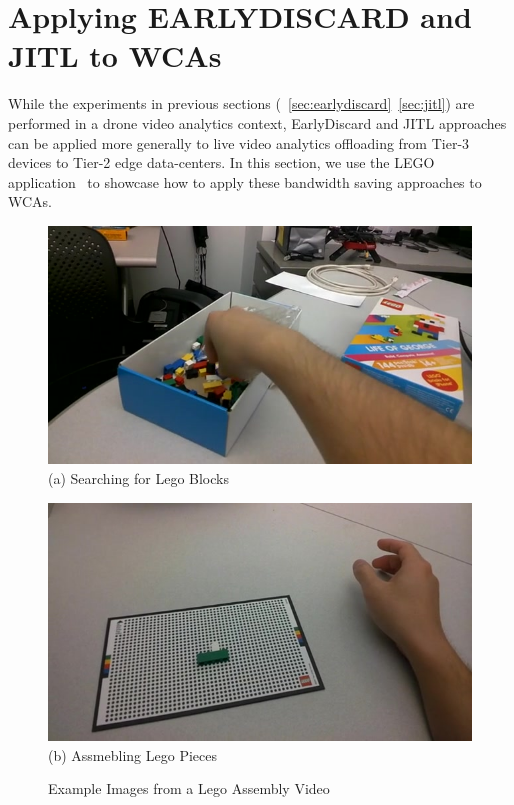 \section{Applying EARLYDISCARD and JITL to WCAs}
\label{bw:wca}

While the experiments in previous sections
(~\ref{sec:earlydiscard}~\ref{sec:jitl}) are performed in a drone video
analytics context, EarlyDiscard and JITL approaches can be applied more
generally to live video analytics offloading from Tier-3 devices to Tier-2 edge
data-centers. In this section, we use the LEGO
application~\cite{chen2018application} to showcase how to apply these bandwidth
saving approaches to WCAs.

\begin{figure}
\centering
\begin{minipage}[]{0.45\linewidth}
\centering
    \includegraphics[width=\linewidth]{FIGS/lego-search}\\
{(a) Searching for Lego Blocks}
\end{minipage}
\begin{minipage}[]{0.45\linewidth}
\centering
\includegraphics[width=\linewidth]{FIGS/lego-assembled}\\
{(b) Assmebling Lego Pieces}
\end{minipage}
\caption{Example Images from a Lego Assembly Video}
\label{fig:wca-lego-example-images}
\end{figure}

